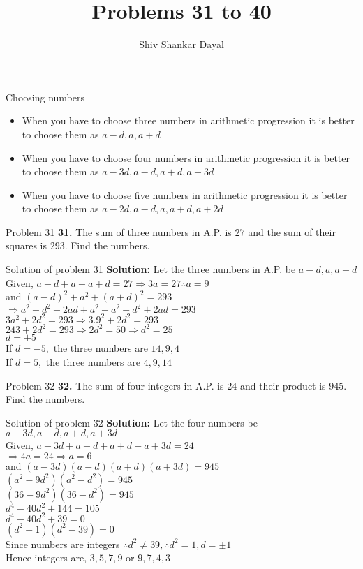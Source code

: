 \documentclass[aspectratio=1610,8pt]{beamer}
\title{Problems 31 to 40}
\author[Shiv Shankar Dayal]{Shiv Shankar Dayal}
\begin{document}
\begin{frame}
       \titlepage
\end{frame}
\begin{frame}{Choosing numbers}
  \begin{itemize}
    \item When you have to choose three numbers in arithmetic progression it is
      better to choose them as $a - d, a, a + d$
    \item When you have to choose four numbers in arithmetic progression it is
      better to choose them as $a-3d, a - d, a + d, a + 3d$
    \item When you have to choose five numbers in arithmetic progression it is
      better to choose them as $a-2d, a - d, a, a + d, a + 2d$
  \end{itemize}
\end{frame}
\begin{frame}{Problem 31}
  \textbf{31.} The sum of three numbers in A.P. is $27$ and the sum of their
  squares is $293.$ Find the numbers.
\end{frame}
\begin{frame}{Solution of problem 31}
  \textbf{Solution:} Let the three numbers in A.P. be $a - d, a, a + d$\\
  Given, $a - d + a + a + d = 27 \Rightarrow 3a = 27 \therefore a = 9$\\
  and $(a - d)^2 + a^2 + (a + d)^2 = 293$\\
  $\Rightarrow a^2 + d^2 - 2ad + a^2 + a^2 + d^2 + 2ad = 293$\\
  $3a^2 + 2d^2 = 293 \Rightarrow 3.9^2 + 2d^2 = 293$\\
  $243 + 2d^2 = 293 \Rightarrow 2d^2 = 50 \Rightarrow d^2 = 25$\\
  $d = \pm 5$\\
  If $d = -5,$ the three numbers are $14, 9, 4$\\
  If $d = 5,$ the three numbers are $4, 9, 14$
\end{frame}
\begin{frame}{Problem 32}
  \textbf{32.} The sum of four integers in A.P. is $24$ and their product is
  $945.$ Find the numbers.
\end{frame}
\begin{frame}{Solution of problem 32}
  \textbf{Solution:} Let the four numbers be $a - 3d, a - d, a + d, a + 3d$\\
  Given, $a - 3d + a - d + a + d + a + 3d = 24$\\
  $\Rightarrow 4a = 24 \Rightarrow a = 6$\\
  and $(a - 3d)(a - d)(a + d)(a + 3d) = 945$\\
  $(a^2 - 9d^2)(a^2 - d^2) = 945$\\
  $(36 - 9d^2)(36 - d^2) = 945$\\
  $d^4 - 40d^2 + 144 = 105$\\
  $d^4 - 40d^2 + 39 = 0$\\
  $(d^2 - 1)(d^2 - 39) = 0$\\
  Since numbers are integers $\therefore d^2 \neq 39, \therefore d^2 = 1, d =
  \pm 1$\\
  Hence integers are, $3, 5, 7, 9$ or $9, 7, 4, 3$
\end{frame}
\end{document}
